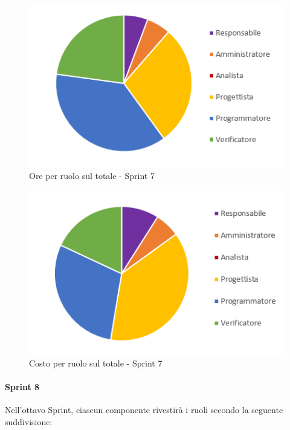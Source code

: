 \begin{figure}[H]
  \centering
  \includegraphics[scale=0.8]{immagini/7Sprint_oreRuolo.png}
  \caption{Ore per ruolo sul totale - Sprint 7}
\end{figure}

\begin{figure}[H]
  \centering
  \includegraphics[scale=0.8]{immagini/7Sprint_costoRuolo.png}
  \caption{Costo per ruolo sul totale - Sprint 7}
\end{figure}
\pagebreak

\paragraph{Sprint 8} \label{paragraph:preventivo_sprint8}
Nell'ottavo Sprint\glo{}, ciascun componente rivestirà i ruoli secondo la seguente suddivisione:

